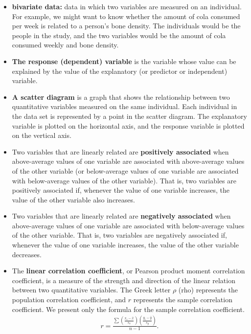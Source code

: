 \documentclass{report}
\begin{document}
    \begin{itemize}
        \item \textbf{bivariate data:} data in which two variables are measured on an individual. For example, we might want to know whether the amount of cola consumed per week is related to a person's bone density. The individuals would be the people in the study, and the two variables would be the amount of cola consumed weekly and bone density.
        \item \textbf{The response (dependent) variable} is the variable whose value can be explained by the value of the explanatory (or predictor or independent) variable.
        \item \textbf{A scatter diagram} is a graph that shows the relationship between two quantitative variables measured on the same individual. Each individual in the data set is represented by a point in the scatter diagram. The explanatory variable is plotted on the horizontal axis, and the response variable is plotted on the vertical axis.
        \item Two variables that are linearly related are \textbf{positively associated} when above-average values of one variable are associated with above-average values of the other variable (or below-average values of one variable are associated with below-average values of the other variable). That is, two variables are positively associated if, whenever the value of one variable increases, the value of the other variable also increases.
        \item Two variables that are linearly related are \textbf{negatively associated} when above-average values of one variable are associated with below-average values of the other variable. That is, two variables are negatively associated if, whenever the value of one variable increases, the value of the other variable decreases.
        \item The \textbf{linear correlation coefficient}, or Pearson product moment correlation coefficient, is a measure of the strength and direction of the linear relation between two quantitative variables. The Greek letter $\rho $ (rho) represents the population correlation coefficient, and $r $ represents the sample correlation coefficient. We present only the formula for the sample correlation coefficient.
            \begin{align*}
                r =\frac{\sum\left(\frac{x_i-\bar{x}}{s_x}\right)\left(\frac{y_i-\bar{y}}{s_y}\right)}{n-1}
            .\end{align*}

\end{itemize}
\end{document}
